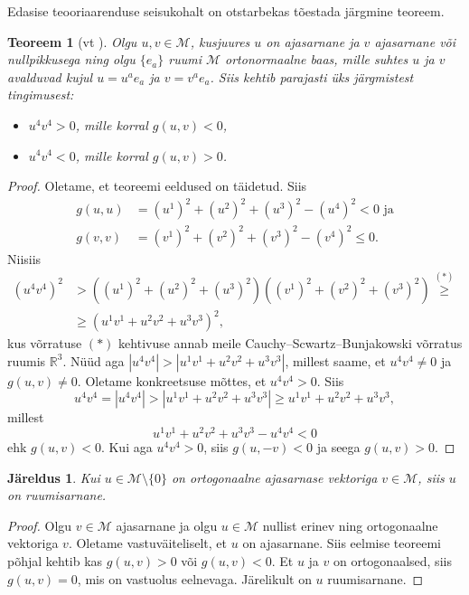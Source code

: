 \documentclass[12pt,a4paper,oneside]{article}
\theoremstyle{plain}
\newtheorem{teoreem}{Teoreem}[section]
\newtheorem{jareldus}{Järeldus}[section]
\theoremstyle{definition}
\numberwithin{equation}{section}
\def\R{{\mathbb R}}
\def\M{{\mathcal M}}
\begin{document}
Edasise teooriaarenduse seisukohalt on otstarbekas tõestada järgmine 
teoreem.
\begin{teoreem} [vt \textnormal{\cite[teoreem 1.3.1]{Naber}}] 
\label{teoreem:ajasarnased_vektorid}
Olgu $u, v \in \M$, kusjuures $u$ on ajasarnane ja $v$ ajasarnane 
või nullpikkusega ning olgu $\{e_a\}$ ruumi $\M$ ortonormaalne baas, 
mille suhtes $u$ ja $v$ avalduvad kujul $u = u^a e_a$ ja 
$v = v^a e_a$. Siis kehtib parajasti üks järgmistest tingimusest:
\begin{itemize}
\item[\emph{(a)}] $u^4 v^4 > 0$, mille korral $g\left(u, v\right) < 0$,
\item[\emph{(b)}] $u^4 v^4 < 0$, mille korral $g\left(u, v\right) > 0$.
\end{itemize}
\end{teoreem}
\begin{proof}
Oletame, et teoreemi eeldused on täidetud. Siis
\begin{align*}
g \left(u, u\right) &= \left(u^1\right)^2 + \left(u^2\right)^2 + 
	\left(u^3\right)^2 - \left(u^4\right)^2 < 0 \text{ ja} \\
g \left(v, v\right) &= \left(v^1\right)^2 + \left(v^2\right)^2 + 
	\left(v^3\right)^2 - \left(v^4\right)^2 \leq 0.
\end{align*}
Niisiis
\begin{align*}
\left(u^4 v^4\right)^2 &> \left( \left(u^1\right)^2 + 
\left(u^2\right)^2 + \left(u^3\right)^2 \right) 
\left( \left(v^1\right)^2 + \left(v^2\right)^2 + 
\left(v^3\right)^2 \right) \overset{(*)}{\geq} \\
&\geq \left(u^1 v^1 + u^2 v^2 + u^3 v^3\right)^2,
\end{align*}
kus võrratuse $(*)$ kehtivuse annab meile Cauchy--Scwartz--Bunjakowski võrratus 
ruumis $\R^3$.
Nüüd aga $|u^4 v^4| > |u^1 v^1 + u^2 v^2 + u^3 v^3|$, millest saame, 
et $u^4 v^4 \neq 0$ ja $g\left (u, v\right ) \neq 0$.
Oletame konkreetsuse mõttes, et $u^4 v^4 > 0$. Siis
\[u^4 v^4 = |u^4 v^4| > |u^1 v^1 + u^2 v^2 + u^3 v^3| 
\geq u^1 v^1 + u^2 v^2 + u^3 v^3,\]
millest
\[u^1 v^1 + u^2 v^2 + u^3 v^3 - u^4 v^4 < 0\]
ehk $g\left (u, v\right ) < 0$.
Kui aga $u^4 v^4 > 0$, siis $g\left (u, -v\right ) < 0$ ja seega 
$g \left (u, v\right ) > 0$.
\end{proof}

\begin{jareldus}
Kui $u \in \M \setminus \{0\}$ on ortogonaalne ajasarnase vektoriga 
$v \in \M$, siis $u$ on ruumisarnane.
\end{jareldus}
\begin{proof}
Olgu $v \in \M$ ajasarnane ja olgu $u \in \M$ nullist erinev ning 
ortogonaalne vektoriga $v$. Oletame vastuväiteliselt, et $u$ on 
ajasarnane. Siis eelmise teoreemi põhjal kehtib kas 
$g\left(u,v\right) > 0$ või $g\left(u,v\right) < 0$. Et $u$ ja $v$ 
on ortogonaalsed, siis $g\left(u,v\right) = 0$, mis on vastuolus 
eelnevaga. Järelikult on $u$ ruumisarnane.
\end{proof}
\end{document}
